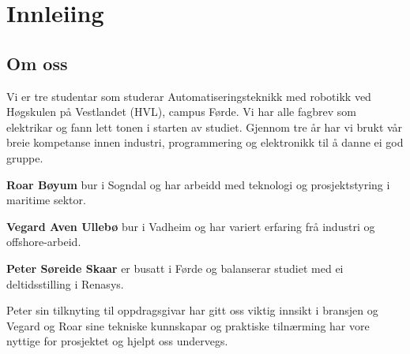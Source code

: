 \chapter{Innleiing}
\thispagestyle{fancy}

\section{Om oss}
Vi er tre studentar som studerar Automatiseringsteknikk med robotikk ved Høgskulen på Vestlandet (\gls{HVL}), campus Førde.
Vi har alle fagbrev som elektrikar og fann lett tonen i starten av studiet. \newline
Gjennom tre år har vi brukt vår breie kompetanse innen industri, programmering og elektronikk
til å danne ei god gruppe.

\textbf{Roar Bøyum} bur i Sogndal og har arbeidd med teknologi og prosjektstyring i maritime sektor.

\textbf{Vegard Aven Ullebø} bur i Vadheim og har variert erfaring frå industri og offshore-arbeid. 

\textbf{Peter Søreide Skaar} er busatt i Førde og balanserar studiet med ei deltidsstilling i Renasys. 

Peter sin tilknyting til oppdragsgivar har gitt oss viktig innsikt i bransjen og 
Vegard og Roar sine tekniske kunnskapar og praktiske tilnærming har vore nyttige for prosjektet og hjelpt oss undervegs.


\newpage


